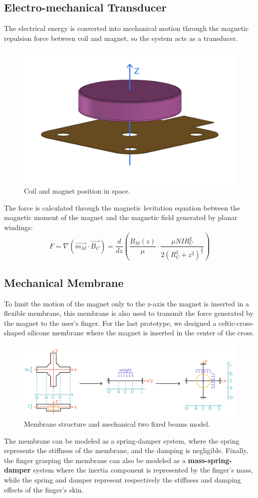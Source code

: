 \subsection{Electro-mechanical Transducer}
The electrical energy is converted into mechanical motion through the magnetic repulsion force between coil and magnet, so the system acts as a transducer.
\begin{figure}[H]
    \centering
    \includegraphics[width=0.4\columnwidth]{Figures/coil_magnet.png} 
    \caption[Coil-Magnet position]{Coil and magnet position in space.}
\end{figure}
The force is calculated through the magnetic levitation equation between the magnetic moment of the magnet and the magnetic field generated by planar windings:
\begin{equation*}
    F = \nabla (\overrightarrow{m_M} \cdot \overrightarrow{B_C}) = \frac{d}{dz} \left( \frac{B_M(z)}{\mu} \cdot \frac{\mu N I R_C^2}{2(R_C^2+z^2)^\frac{3}{2}} \right)
\end{equation*}

\subsection{Mechanical Membrane}
To limit the motion of the magnet only to the z-axis the magnet is inserted in a flexible membrane, this membrane is also used to transmit the force generated by the magnet to the user's finger.
For the last prototype, we designed a celtic-cross-shaped silicone membrane where the magnet is inserted in the center of the cross.
\begin{figure}[H]
    \centering
    \includegraphics[width=0.9\linewidth]{Figures/membr_mech_model.jpg} 
    \caption[Membrane structure]{Membrane structure and mechanical two fixed beams model.}
\end{figure}
The membrane can be modeled as a spring-damper system, where the spring represents the stiffness of the membrane, and the damping is negligible.
Finally, the finger grasping the membrane can also be modeled as a \textbf{mass-spring-damper} system where the inertia component is represented by the finger's mass, while the spring and damper represent respectively the stiffness and damping effects of the finger's skin.
